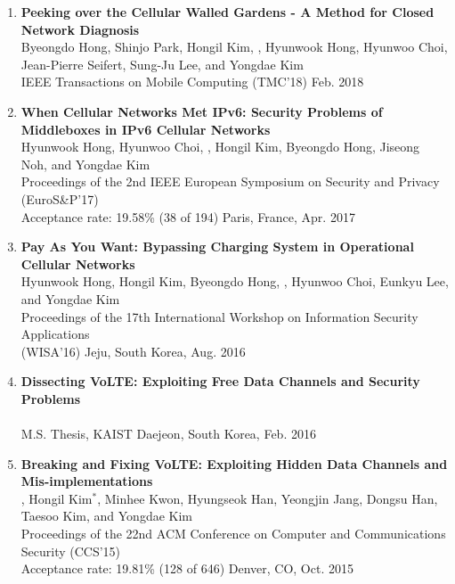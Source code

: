 \begin{enumerate}[leftmargin=1.5em]
    \item \textbf{Peeking over the Cellular Walled Gardens - A Method for Closed Network Diagnosis} \\
        {\small
            Byeongdo Hong, Shinjo Park, Hongil Kim, , Hyunwook Hong, Hyunwoo Choi, Jean-Pierre Seifert, Sung-Ju Lee, and Yongdae Kim \\
            IEEE Transactions on Mobile Computing (TMC'18)
        }
        \hfill {\small Feb. 2018}

    \item \textbf{When Cellular Networks Met IPv6: Security Problems of Middleboxes in IPv6 Cellular Networks} \\
        {\small
            Hyunwook Hong, Hyunwoo Choi, , Hongil Kim, Byeongdo Hong, Jiseong Noh, and Yongdae Kim \\
            Proceedings of the 2nd IEEE European Symposium on Security and Privacy (EuroS\&P'17)\\
            Acceptance rate: 19.58\% (38 of 194)
        }
        \hfill {\small Paris, France, Apr. 2017}

    \item \textbf{Pay As You Want: Bypassing Charging System in Operational Cellular Networks} \\
        {\small
            Hyunwook Hong, Hongil Kim, Byeongdo Hong, , Hyunwoo Choi, Eunkyu Lee, and Yongdae Kim \\
            Proceedings of the 17th International Workshop on Information Security Applications \\ (WISA'16)
        }
        \hfill {\small Jeju, South Korea, Aug. 2016}

    \item \textbf{Dissecting VoLTE: Exploiting Free Data Channels and Security Problems} \\
        {\small
             \\
            M.S. Thesis, KAIST
        }
        \hfill {\small Daejeon, South Korea, Feb. 2016}

    \item \textbf{Breaking and Fixing VoLTE: Exploiting Hidden Data Channels and Mis-implementations} \\
        {\small
            , Hongil Kim$^\ast$, Minhee Kwon, Hyungseok Han, Yeongjin Jang, Dongsu Han, Taesoo Kim, and Yongdae Kim \\
            Proceedings of the 22nd ACM Conference on Computer and Communications Security (CCS'15) \\
            Acceptance rate: 19.81\% (128 of 646)
        }
        \hfill {\small Denver, CO, Oct. 2015}


\end{enumerate}
